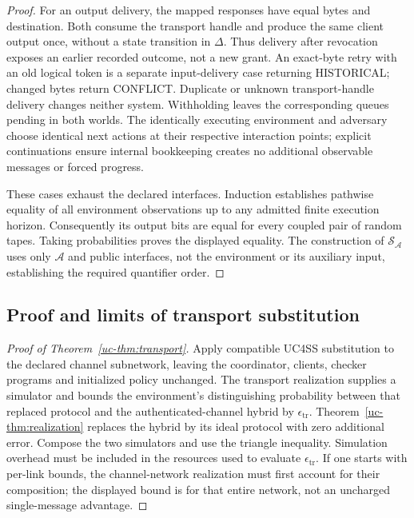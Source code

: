 \begin{proof}
For an output delivery, the mapped responses have equal bytes and
destination. Both consume the transport handle and produce the same
client output once, without a state transition in $\Delta$.
Thus delivery after revocation exposes an earlier recorded outcome,
not a new grant. An exact-byte retry with an old logical token is a separate
input-delivery case returning HISTORICAL; changed bytes return CONFLICT.
Duplicate or unknown transport-handle delivery changes neither system.
Withholding leaves the corresponding queues pending in both worlds.
The identically executing environment and adversary choose identical
next actions at their respective interaction points; explicit
continuations ensure internal bookkeeping creates no additional
observable messages or forced progress.

These cases exhaust the declared interfaces. Induction establishes
pathwise equality of all environment observations up to any admitted
finite execution horizon. Consequently its output bits are equal for
every coupled pair of random tapes. Taking probabilities proves the
displayed equality. The construction of $\mathcal S_{\mathcal A}$ uses
only $\mathcal A$ and public interfaces, not the environment or its
auxiliary input, establishing the required quantifier order.
\end{proof}

\subsection{Proof and limits of transport substitution}
\begin{proof}[Proof of Theorem~\ref{uc-thm:transport}]
Apply compatible UC4SS substitution to the declared channel subnetwork,
leaving the coordinator, clients, checker programs and initialized policy
unchanged. The transport realization supplies a simulator and bounds
the environment's distinguishing probability between that replaced
protocol and the authenticated-channel hybrid by
$\epsilon_{\mathrm{tr}}$. Theorem~\ref{uc-thm:realization} replaces the
hybrid by its ideal protocol with zero additional error.
Compose the two simulators and use the triangle inequality. Simulation
overhead must be included in the resources used to evaluate
$\epsilon_{\mathrm{tr}}$. If one starts with per-link bounds, the
channel-network realization must first account for their composition;
the displayed bound is for that entire network, not an uncharged
single-message advantage.
\end{proof}

